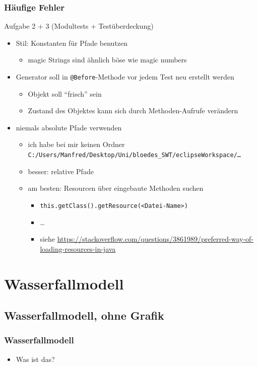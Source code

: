 \documentclass[18pt]{beamer}
\begin{document}
\begin{frame}
	\frametitle{Häufige Fehler}
	\begin{block}{Aufgabe 2 + 3 (Modultests + Testüberdeckung)}
		\begin{itemize}
			\item Stil: Konstanten für Pfade benutzen
			\begin{itemize}
				\item magic Strings sind ähnlich böse wie magic numbers
			\end{itemize}
			\pause
			\item Generator soll in \texttt{@Before}-Methode vor jedem Test neu erstellt werden
			\begin{itemize}
				\item Objekt soll \enquote{frisch} sein
				\item Zustand des Objektes kann sich durch Methoden-Aufrufe verändern
			\end{itemize}
			\pause
			\item niemals absolute Pfade verwenden
			\begin{itemize}
				\item ich habe bei mir keinen Ordner \texttt{C:/Users/Manfred/Desktop/Uni/bloedes\_SWT/eclipseWorkspace/\dots}
				\item besser: relative Pfade 
				\item am besten: Resourcen über eingebaute Methoden suchen
				\begin{itemize}
					\item \texttt{this.getClass().getResource(<Datei-Name>)}
					\item \dots
					\item siehe \url{https://stackoverflow.com/questions/3861989/preferred-way-of-loading-resources-in-java}
				\end{itemize}
			\end{itemize}
		\end{itemize}
	\end{block}
\end{frame}

\section{Wasserfallmodell}
	\subsection{Wasserfallmodell, ohne Grafik}
	\begin{frame}
		\frametitle{Wasserfallmodell}
		\begin{itemize}
			\item Was ist das? 
		\end{itemize}
	\end{frame}
	
\end{document}
